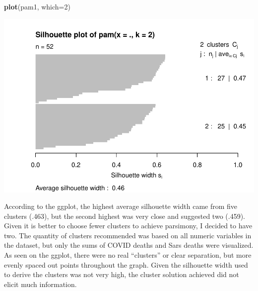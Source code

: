 \documentclass[
]{article}
\newenvironment{Shaded}{\begin{snugshade}}{\end{snugshade}}
\newcommand{\DataTypeTok}[1]{\textcolor[rgb]{0.13,0.29,0.53}{#1}}
\newcommand{\DecValTok}[1]{\textcolor[rgb]{0.00,0.00,0.81}{#1}}
\newcommand{\KeywordTok}[1]{\textcolor[rgb]{0.13,0.29,0.53}{\textbf{#1}}}
\newcommand{\NormalTok}[1]{#1}
\begin{document}
\begin{Shaded}
\begin{Highlighting}[]
\KeywordTok{plot}\NormalTok{(pam1, }\DataTypeTok{which=}\DecValTok{2}\NormalTok{)}
\end{Highlighting}
\end{Shaded}

\begin{center}\includegraphics{project1_files/figure-latex/unnamed-chunk-5-3} \end{center}

According to the ggplot, the highest average silhouette width came from
five clusters (.463), but the second highest was very close and
suggested two (.459). Given it is better to choose fewer clusters to
achieve parsimony, I decided to have two. The quantity of clusters
recommended was based on all numeric variables in the dataset, but only
the sums of COVID deaths and Sars deaths were visualized. As seen on the
ggplot, there were no real ``clusters'' or clear separation, but more
evenly spaced out points throughout the graph. Given the silhouette
width used to derive the clusters was not very high, the cluster
solution achieved did not elicit much information.
\end{document}
